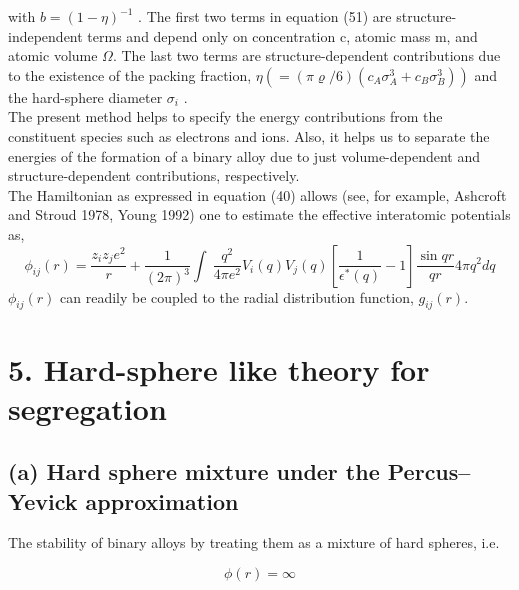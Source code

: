 \documentclass[12pt]{article}
\newcommand*{\1}{\hspace{1pt}}
\begin{document}
with $b = (1 - \eta)^{-1}$ . The first two terms in equation (51) are structure-independent terms and 
depend only on concentration c, atomic mass m, and atomic volume $\Omega $. The last two terms are 
structure-dependent contributions due to the existence of the packing
fraction, $\eta (= (\pi \varrho/6)(c_A\sigma^3_A + c_B\sigma^3_{B})) $ and the hard-sphere diameter $\sigma _{i}$ .\\
    The present method helps to specify the energy contributions from the constituent
species such as electrons and ions. Also, it helps us to separate the energies of the formation
of a binary alloy due to just volume-dependent and structure-dependent contributions,
respectively.\\
The Hamiltonian as expressed in equation (40) allows (see, for example, Ashcroft and Stroud 1978, Young
1992) one to estimate the effective interatomic potentials as,
    \begin{equation}
        \phi _{ij}(r) = \frac{z_{i}z_{j}e^2}{r} + \frac{1}{(2\pi)^3}\int_{}^{}  \,\frac{q^2}{4\pi e^2}V_{i}(q)V_{j}(q)
        \left[\frac{1}{\epsilon ^{\ast}(q) } - 1\right]\frac{\sin qr}{qr} 4\pi q^2 dq 
    \end{equation}
$\phi _{ij}(r)$ can readily be coupled to the radial distribution function, $g_{ij}(r)$.\\

\section*{5. Hard-sphere like theory for segregation}

\subsection*{(a) Hard sphere mixture under the Percus–Yevick approximation}

The stability of binary alloys by treating them as a mixture of hard spheres, i.e.

\begin{equation}
    \phi (r) = \infty    %
\end{equation}
\end{document}
